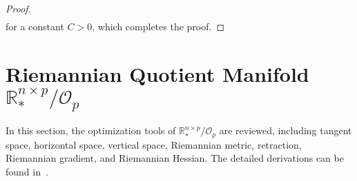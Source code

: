 \documentclass[11pt]{article}
\numberwithin{equation}{section}
\begin{document}
\begin{proof}
\begin{equation}
\begin{aligned}
  	   \end{aligned} 
  	  \end{equation}
  	  for a constant $C>0$, which completes the proof. %

\end{proof}

\section{Riemannian Quotient Manifold \texorpdfstring{$\mathbb{R}_*^{n\times p}/\mathcal{O}_p$}{} } \label{QuotMani}

In this section, the optimization tools of $\mathbb{R}_*^{n \times p}/\mathcal{O}_p$ are reviewed, including tangent space, horizontal space, vertical space, Riemannian metric, retraction, Riemannian gradient, and Riemannian Hessian. The detailed derivations can be found in~\cite{Zheng2022RiemannianOU}.




\end{document}
